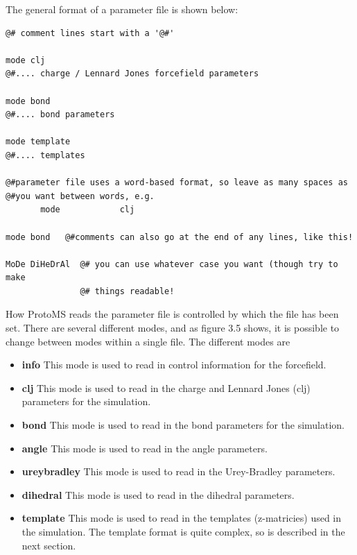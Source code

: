 \documentclass[letterpaper,10pt,english]{manual}
\begin{document}
The general format of a parameter file is shown below:

\begin{Verbatim}[commandchars=@\[\]]
@# comment lines start with a '@#'

mode clj
@#.... charge / Lennard Jones forcefield parameters

mode bond
@#.... bond parameters

mode template
@#.... templates

@#parameter file uses a word-based format, so leave as many spaces as
@#you want between words, e.g.
       mode            clj

mode bond   @#comments can also go at the end of any lines, like this!

MoDe DiHeDrAl  @# you can use whatever case you want (though try to make
               @# things readable!
\end{Verbatim}

How ProtoMS reads the parameter file is controlled by which  the file has been set. There are several different modes, and as figure 3.5 shows, it is possible to change between modes within a single file. The different modes are
\begin{itemize}
\item {} 
\textbf{info} This mode is used to read in control information for the forcefield.

\item {} 
\textbf{clj} This mode is used to read in the charge and Lennard Jones (clj) parameters for the simulation.

\item {} 
\textbf{bond} This mode is used to read in the bond parameters for the simulation.

\item {} 
\textbf{angle} This mode is used to read in the angle parameters.

\item {} 
\textbf{ureybradley} This mode is used to read in the Urey-Bradley parameters.

\item {} 
\textbf{dihedral} This mode is used to read in the dihedral parameters.

\item {} 
\textbf{template} This mode is used to read in the templates (z-matricies) used in the simulation. The template format is quite complex, so is described in the next section.

\end{itemize}
\end{document}
